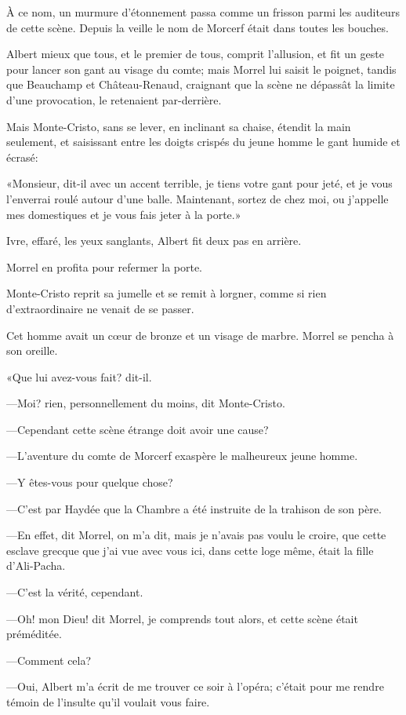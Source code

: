 À ce nom, un murmure d'étonnement passa comme un frisson parmi les auditeurs de cette scène. Depuis la veille le nom de Morcerf était dans toutes les bouches. 

Albert mieux que tous, et le premier de tous, comprit l'allusion, et fit un geste pour lancer son gant au visage du comte; mais Morrel lui saisit le poignet, tandis que Beauchamp et Château-Renaud, craignant que la scène ne dépassât la limite d'une provocation, le retenaient par-derrière. 

Mais Monte-Cristo, sans se lever, en inclinant sa chaise, étendit la main seulement, et saisissant entre les doigts crispés du jeune homme le gant humide et écrasé: 

«Monsieur, dit-il avec un accent terrible, je tiens votre gant pour jeté, et je vous l'enverrai roulé autour d'une balle. Maintenant, sortez de chez moi, ou j'appelle mes domestiques et je vous fais jeter à la porte.» 

Ivre, effaré, les yeux sanglants, Albert fit deux pas en arrière. 

Morrel en profita pour refermer la porte. 

Monte-Cristo reprit sa jumelle et se remit à lorgner, comme si rien d'extraordinaire ne venait de se passer. 

Cet homme avait un cœur de bronze et un visage de marbre. Morrel se pencha à son oreille. 

«Que lui avez-vous fait? dit-il. 

—Moi? rien, personnellement du moins, dit Monte-Cristo. 

—Cependant cette scène étrange doit avoir une cause? 

—L'aventure du comte de Morcerf exaspère le malheureux jeune homme. 

—Y êtes-vous pour quelque chose? 

—C'est par Haydée que la Chambre a été instruite de la trahison de son père. 

—En effet, dit Morrel, on m'a dit, mais je n'avais pas voulu le croire, que cette esclave grecque que j'ai vue avec vous ici, dans cette loge même, était la fille d'Ali-Pacha. 

—C'est la vérité, cependant. 

—Oh! mon Dieu! dit Morrel, je comprends tout alors, et cette scène était préméditée. 

—Comment cela? 

—Oui, Albert m'a écrit de me trouver ce soir à l'opéra; c'était pour me rendre témoin de l'insulte qu'il voulait vous faire. 

